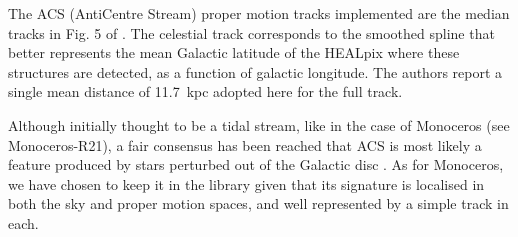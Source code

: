 The ACS (AntiCentre Stream) proper motion tracks implemented are the median tracks in Fig. 5 of \citet[][data provided by P. Ramos priv. comm.]{Ramos2021}. The celestial track corresponds to the smoothed spline that better represents the mean Galactic latitude of the HEALpix where these structures are detected, as a function of galactic longitude. The authors report a single mean distance of 11.7~kpc adopted here for the full track. 

Although initially thought to be a tidal stream, like in the case of Monoceros (see Monoceros-R21), a fair consensus has been reached that ACS is most likely a feature produced by stars perturbed out of the Galactic disc \citep[e.g.][and references therein]{Laporte2019a,Laporte2019b,Ramos2021}. As for Monoceros, we have chosen to keep it in the library given that its signature is localised in both the sky and proper motion spaces, and well represented
by a simple track in each.
